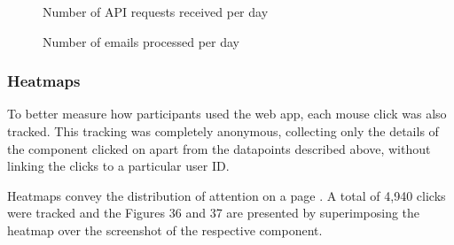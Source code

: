 \documentclass{article}
\begin{document}
\begin{figure}[h]
	\centering
	\begin{minipage}{.47\textwidth}
		\caption{Number of API requests received per day}
	\end{minipage}%
	\hspace{.5cm}
	\begin{minipage}{.47\textwidth}
		\caption{Number of emails processed per day}
	\end{minipage}
\end{figure}

\subsubsection{Heatmaps}

To better measure how participants used the web app, each mouse click was also tracked. This tracking was completely anonymous, collecting only the details of the component clicked on apart from the datapoints described above, without linking the clicks to a particular user ID.

Heatmaps convey the distribution of attention on a page \cite{gu_predicting_2020}. A total of 4,940 clicks were tracked and the Figures 36 and 37 are presented by superimposing the heatmap over the screenshot of the respective component.
\end{document}
